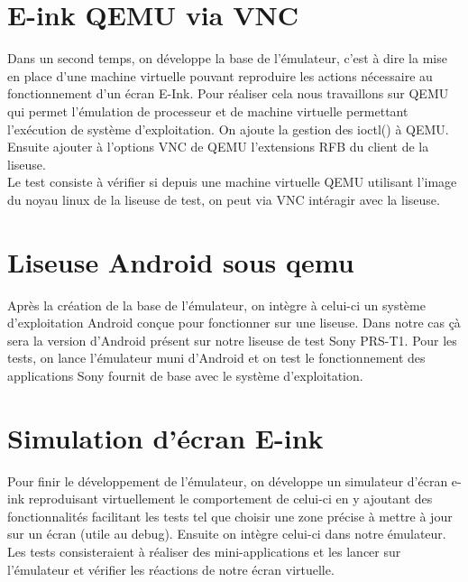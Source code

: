 \newpage

\section{E-ink QEMU via VNC}

Dans un second temps, on développe la base de l'émulateur, c'est à dire la mise en place d'une machine virtuelle pouvant reproduire les actions nécessaire au fonctionnement d'un écran E-Ink. Pour réaliser cela nous travaillons sur QEMU qui permet l'émulation de processeur et de machine virtuelle permettant l'exécution de système d'exploitation. On ajoute la gestion des ioctl() à QEMU. Ensuite ajouter à l'options VNC de QEMU l'extensions RFB du client de la liseuse.
\\Le test consiste à vérifier si depuis une machine virtuelle QEMU utilisant l'image du noyau linux de la liseuse de test, on peut via VNC intéragir avec la liseuse. 


\section{Liseuse Android sous qemu}

Après la création de la base de l'émulateur, on intègre à celui-ci un système d'exploitation Android conçue pour fonctionner sur une liseuse. Dans notre cas çà sera la version d'Android présent sur notre liseuse de test Sony PRS-T1.
Pour les tests, on lance l'émulateur muni d'Android et on test le fonctionnement des applications Sony fournit de base avec le système d'exploitation.

\section{Simulation d'écran E-ink}

Pour finir le développement de l'émulateur, on développe un simulateur d'écran e-ink reproduisant virtuellement le comportement de celui-ci en y ajoutant des fonctionnalités facilitant les tests tel que choisir une zone précise à mettre à jour sur un écran (utile au debug). Ensuite on intègre celui-ci dans notre émulateur.
\\Les tests consisteraient à réaliser des mini-applications et les lancer sur l'émulateur et vérifier les réactions de notre écran virtuelle.

